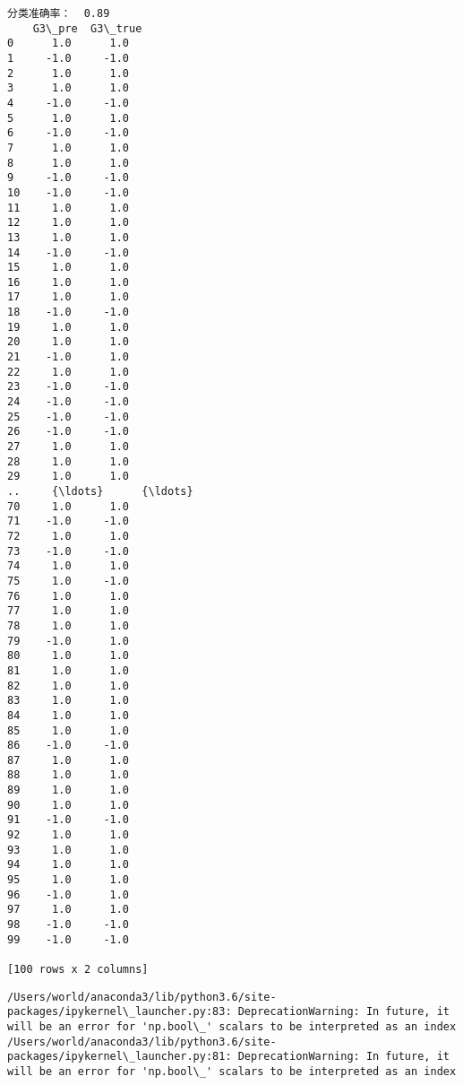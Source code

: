 \documentclass[11pt]{article}
\begin{document}
    \begin{Verbatim}[commandchars=\\\{\}]
分类准确率：  0.89
    G3\_pre  G3\_true
0      1.0      1.0
1     -1.0     -1.0
2      1.0      1.0
3      1.0      1.0
4     -1.0     -1.0
5      1.0      1.0
6     -1.0     -1.0
7      1.0      1.0
8      1.0      1.0
9     -1.0     -1.0
10    -1.0     -1.0
11     1.0      1.0
12     1.0      1.0
13     1.0      1.0
14    -1.0     -1.0
15     1.0      1.0
16     1.0      1.0
17     1.0      1.0
18    -1.0     -1.0
19     1.0      1.0
20     1.0      1.0
21    -1.0      1.0
22     1.0      1.0
23    -1.0     -1.0
24    -1.0     -1.0
25    -1.0     -1.0
26    -1.0     -1.0
27     1.0      1.0
28     1.0      1.0
29     1.0      1.0
..     {\ldots}      {\ldots}
70     1.0      1.0
71    -1.0     -1.0
72     1.0      1.0
73    -1.0     -1.0
74     1.0      1.0
75     1.0     -1.0
76     1.0      1.0
77     1.0      1.0
78     1.0      1.0
79    -1.0      1.0
80     1.0      1.0
81     1.0      1.0
82     1.0      1.0
83     1.0      1.0
84     1.0      1.0
85     1.0      1.0
86    -1.0     -1.0
87     1.0      1.0
88     1.0      1.0
89     1.0      1.0
90     1.0      1.0
91    -1.0     -1.0
92     1.0      1.0
93     1.0      1.0
94     1.0      1.0
95     1.0      1.0
96    -1.0      1.0
97     1.0      1.0
98    -1.0     -1.0
99    -1.0     -1.0

[100 rows x 2 columns]

    \end{Verbatim}

    \begin{Verbatim}[commandchars=\\\{\}]
/Users/world/anaconda3/lib/python3.6/site-packages/ipykernel\_launcher.py:83: DeprecationWarning: In future, it will be an error for 'np.bool\_' scalars to be interpreted as an index
/Users/world/anaconda3/lib/python3.6/site-packages/ipykernel\_launcher.py:81: DeprecationWarning: In future, it will be an error for 'np.bool\_' scalars to be interpreted as an index

    \end{Verbatim}


    
    
    
    
\end{document}
